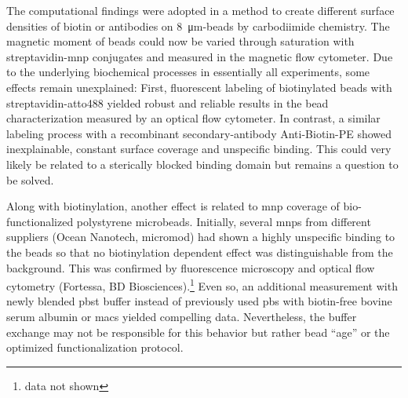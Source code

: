 The computational findings were adopted in a method to create different surface densities of biotin or antibodies on \SI{8}{\micro\meter}-beads by carbodiimide chemistry. The magnetic moment of beads could now be varied through saturation with streptavidin-\gls{mnp} conjugates and measured in the magnetic flow cytometer. 
Due to the underlying biochemical processes in essentially all experiments, some effects remain unexplained: First, fluorescent labeling of biotinylated beads with strept\-avidin-atto488 yielded robust and reliable results in the bead characterization measured by an optical flow cytometer. In contrast, a similar labeling process with a recombinant secondary-antibody Anti-Biotin-PE showed inexplainable, constant surface coverage and unspecific binding. This could very likely be related to a sterically blocked binding domain but remains a question to be solved.

Along with biotinylation, another effect is related to \gls{mnp} coverage of bio-functionalized polystyrene microbeads. Initially, several \glspl{mnp} from different suppliers (Ocean Nanotech, micromod) had shown a highly unspecific binding to the beads so that no biotinylation dependent effect was distinguishable from the background. This was confirmed by fluorescence microscopy and optical flow cytometry (Fortessa, BD Biosciences).\footnote{data not shown} Even so, an additional measurement with newly blended \gls{pbst} buffer instead of previously used \gls{pbs} with biotin-free bovine serum albumin or \gls{macs} yielded compelling data. Nevertheless, the buffer exchange may not be responsible for this behavior but rather bead ``age'' or the optimized functionalization protocol.
\clearpage

